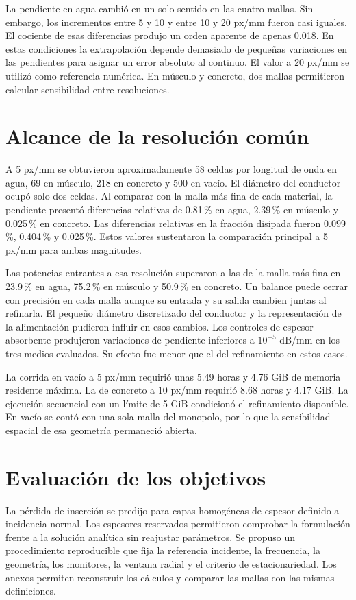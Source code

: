 La pendiente en agua cambió en un solo sentido en las cuatro mallas. Sin embargo, los incrementos entre 5 y 10 y entre 10 y 20 px/mm fueron casi iguales. El cociente de esas diferencias produjo un orden aparente de apenas 0.018. En estas condiciones la extrapolación depende demasiado de pequeñas variaciones en las pendientes para asignar un error absoluto al continuo. El valor a 20 px/mm se utilizó como referencia numérica. En músculo y concreto, dos mallas permitieron calcular sensibilidad entre resoluciones.

\section{Alcance de la resolución común}
A 5 px/mm se obtuvieron aproximadamente 58 celdas por longitud de onda en agua, 69 en músculo, 218 en concreto y 500 en vacío. El diámetro del conductor ocupó solo dos celdas. Al comparar con la malla más fina de cada material, la pendiente presentó diferencias relativas de 0.81\,\% en agua, 2.39\,\% en músculo y 0.025\,\% en concreto. Las diferencias relativas en la fracción disipada fueron 0.099\,\%, 0.404\,\% y 0.025\,\%. Estos valores sustentaron la comparación principal a 5 px/mm para ambas magnitudes.

Las potencias entrantes a esa resolución superaron a las de la malla más fina en 23.9\,\% en agua, 75.2\,\% en músculo y 50.9\,\% en concreto. Un balance puede cerrar con precisión en cada malla aunque su entrada y su salida cambien juntas al refinarla. El pequeño diámetro discretizado del conductor y la representación de la alimentación pudieron influir en esos cambios. Los controles de espesor absorbente produjeron variaciones de pendiente inferiores a $10^{-5}$ dB/mm en los tres medios evaluados. Su efecto fue menor que el del refinamiento en estos casos.

La corrida en vacío a 5 px/mm requirió unas 5.49 horas y 4.76 GiB de memoria residente máxima. La de concreto a 10 px/mm requirió 8.68 horas y 4.17 GiB. La ejecución secuencial con un límite de 5 GiB condicionó el refinamiento disponible. En vacío se contó con una sola malla del monopolo, por lo que la sensibilidad espacial de esa geometría permaneció abierta.

\section{Evaluación de los objetivos}
La pérdida de inserción se predijo para capas homogéneas de espesor definido a incidencia normal. Los espesores reservados permitieron comprobar la formulación frente a la solución analítica sin reajustar parámetros. Se propuso un procedimiento reproducible que fija la referencia incidente, la frecuencia, la geometría, los monitores, la ventana radial y el criterio de estacionariedad. Los anexos permiten reconstruir los cálculos y comparar las mallas con las mismas definiciones.

